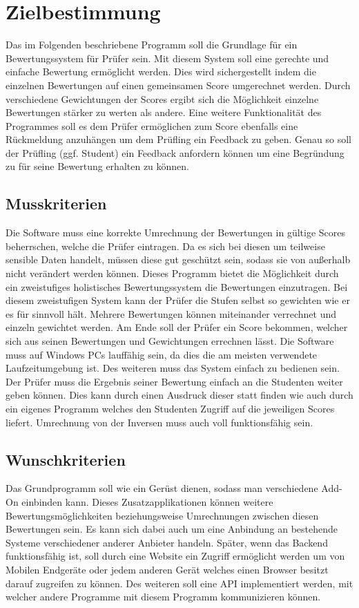 \documentclass[a4paper,listof=leveldown,listof=numbered]{scrreprt}
\begin{document}
	
	
	\tableofcontents
	
\chapter{Zielbestimmung}
	Das im Folgenden beschriebene Programm soll die Grundlage für ein Bewertungssystem für Prüfer sein. Mit diesem System soll eine gerechte und einfache Bewertung ermöglicht werden. Dies wird sichergestellt indem die einzelnen Bewertungen auf einen gemeinsamen Score umgerechnet werden. Durch verschiedene Gewichtungen der Scores ergibt sich die Möglichkeit einzelne Bewertungen stärker zu werten als andere. Eine weitere Funktionalität des Programmes soll es dem Prüfer ermöglichen zum Score ebenfalls eine Rückmeldung anzuhängen um dem Prüfling ein Feedback zu geben. Genau so soll der Prüfling (ggf. Student) ein Feedback anfordern können um eine Begründung zu für seine Bewertung erhalten zu können.
	
	\section{Musskriterien}
	Die Software muss eine korrekte Umrechnung der Bewertungen in gültige Scores beherrschen, welche die Prüfer eintragen. Da es sich bei diesen um teilweise sensible Daten handelt, müssen diese gut geschützt sein, sodass sie von außerhalb nicht verändert werden können. Dieses Programm bietet die Möglichkeit durch ein zweistufiges holistisches Bewertungssystem die Bewertungen einzutragen. Bei diesem zweistufigen System kann der Prüfer die Stufen selbst so gewichten wie er es für sinnvoll hält. Mehrere Bewertungen können miteinander verrechnet und einzeln gewichtet werden. Am Ende soll der Prüfer ein Score bekommen, welcher sich aus seinen Bewertungen und Gewichtungen errechnen lässt. Die Software muss auf Windows PCs lauffähig sein, da dies die am meisten verwendete Laufzeitumgebung ist. Des weiteren muss das System einfach zu bedienen sein. Der Prüfer muss die Ergebnis seiner Bewertung einfach an die Studenten weiter geben können. Dies kann durch einen Ausdruck dieser statt finden wie auch durch ein eigenes Programm welches den Studenten Zugriff auf die jeweiligen Scores liefert. Umrechnung von der Inversen muss auch voll funktionsfähig sein. 
	
	\section{Wunschkriterien}
	Das Grundprogramm soll wie ein Gerüst dienen, sodass man verschiedene \acs{Add-On} einbinden kann. Dieses Zusatzapplikationen können weitere Bewertungsmöglichkeiten beziehungsweise Umrechnungen zwischen diesen Bewertungen sein. Es kann sich dabei auch um eine Anbindung an bestehende Systeme verschiedener anderer Anbieter handeln. Später, wenn das Backend funktionsfähig ist, soll durch eine Website ein Zugriff ermöglicht werden um von Mobilen Endgeräte oder jedem anderen Gerät welches einen Browser besitzt darauf zugreifen zu können. Des weiteren soll eine \ac{API} implementiert werden, mit welcher andere Programme mit diesem Programm kommunizieren können.
	
\end{document}
